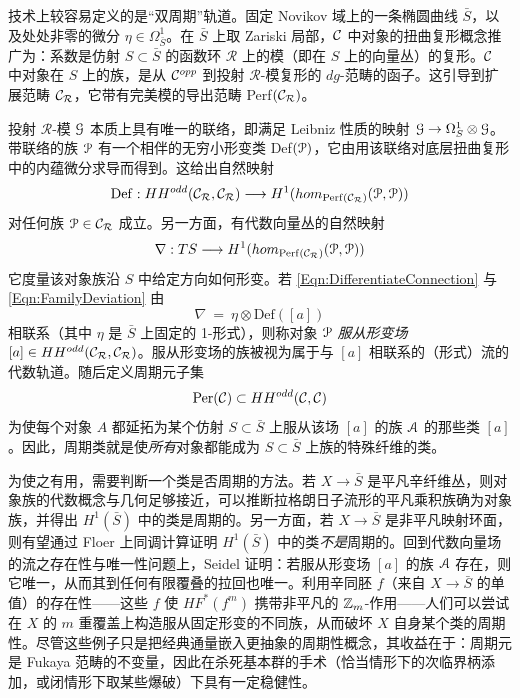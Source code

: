 
技术上较容易定义的是“双周期”轨道。固定 Novikov 域上的一条椭圆曲线 $\bar{S}$，以及处处非零的微分 $\eta \in \Omega^1_{\bar{S}}$。在 $\bar{S}$ 上取 Zariski 局部，$\mathcal{C}$ 中对象的扭曲复形概念推广为：系数是仿射 $S \subset \bar{S}$ 的函数环 $\mathcal{R}$ 上的模（即在 $S$ 上的向量丛）的复形。$\mathcal{C}$ 中对象在 $S$ 上的族，是从 $\mathcal{C}^{opp}$ 到投射 $\mathcal{R}$-模复形的 $dg$-范畴的函子。这引导到扩展范畴 $\mathcal{C}_{\mathcal{R}}$，它带有完美模的导出范畴 Perf$(\mathcal{C}_{\mathcal{R}})$。

投射 $\mathcal{R}$-模 $\EuScript{G}$ 本质上具有唯一的联络，即满足 Leibniz 性质的映射 $\EuScript{G} \rightarrow \Omega^1_{S} \otimes \EuScript{G}$。带联络的族 $\EuScript{P}$ 有一个相伴的无穷小形变类 Def$(\EuScript{P})$，它由用该联络对底层扭曲复形中的内蕴微分求导而得到。这给出自然映射
\begin{equation} \label{Eqn:DifferentiateConnection}
\mathrm{Def}: HH^{odd}(\mathcal{C}_{\mathcal{R}}, \mathcal{C}_{\mathcal{R}}) \longrightarrow H^1(hom_{\mathrm{Perf}(\mathcal{C}_{\mathcal{R}})}(\EuScript{P}, \EuScript{P}))
\end{equation}
对任何族 $\EuScript{P} \in \mathcal{C}_{\mathcal{R}}$ 成立。另一方面，有代数向量丛的自然映射
\begin{equation} \label{Eqn:FamilyDeviation}
\nabla: TS \longrightarrow H^1(hom_{\mathrm{Perf}(\mathcal{C}_{\mathcal{R}})}(\EuScript{P}, \EuScript{P}))
\end{equation}
它度量该对象族沿 $S$ 中给定方向如何形变。若 \eqref{Eqn:DifferentiateConnection} 与 \eqref{Eqn:FamilyDeviation} 由
\[
\nabla \ = \ \eta \otimes \mathrm{Def}([a])
\]
相联系（其中 $\eta$ 是 $\bar{S}$ 上固定的 1-形式），则称对象 $\EuScript{P}$ \emph{服从形变场} $[a] \in HH^{odd}(\mathcal{C}_{\mathcal{R}}, \mathcal{C}_{\mathcal{R}})$。服从形变场的族被视为属于与 $[a]$ 相联系的（形式）流的代数轨道。随后定义周期元子集
\[
\mathrm{Per}(\mathcal{C}) \subset HH^{odd}(\mathcal{C},\mathcal{C})
\]
为使每个对象 $A$ 都延拓为某个仿射 $S\subset \bar{S}$ 上服从该场 $[a]$ 的族 $\EuScript{A}$ 的那些类 $[a]$。因此，周期类就是使\emph{所有}对象都能成为 $S\subset \bar{S}$ 上族的特殊纤维的类。

为使之有用，需要判断一个类是否周期的方法。若 $X \rightarrow \bar{S}$ 是平凡辛纤维丛，则对象族的代数概念与几何足够接近，可以推断拉格朗日子流形的平凡乘积族确为对象族，并得出 $H^1(\bar{S})$ 中的类是周期的。另一方面，若 $X\rightarrow \bar{S}$ 是非平凡映射环面，则有望通过 Floer 上同调计算证明 $H^1(\bar{S})$ 中的类\emph{不是}周期的。回到代数向量场的流之存在性与唯一性问题上，Seidel 证明：若服从形变场 $[a]$ 的族 $\EuScript{A}$ 存在，则它唯一，从而其到任何有限覆叠的拉回也唯一。利用辛同胚 $f$（来自 $X\rightarrow \bar{S}$ 的单值）的存在性——这些 $f$ 使 $HF^*(f^m)$ 携带非平凡的 $\mathbb{Z}_m$-作用——人们可以尝试在 $X$ 的 $m$ 重覆盖上构造服从固定形变的不同族，从而破坏 $X$ 自身某个类的周期性。尽管这些例子只是把经典通量嵌入更抽象的周期性概念，其收益在于：周期元是 Fukaya 范畴的不变量，因此在杀死基本群的手术（恰当情形下的次临界柄添加，或闭情形下取某些爆破）下具有一定稳健性。

